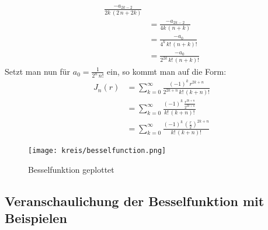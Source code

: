 \begin{refsection}
\begin{align*}
	\frac
	{
		-a_{2k - 2}
	}{
		2k \, \left( 2 \, n + 2k \right)	
	} \\
	&=
	\frac
	{
		-a_{2k - 2}
	}{
		4k \, \left( n + k \right)	
	} \\
	&=
	\frac
	{
		-a_0
	}{
		4^k \, {k}! \, {\left( n + k \right)}!
	} \\
	&=
	\frac
	{
		-a_0
	}{
		2^{2k} \, {k}! \, {\left( n + k \right)}!
	}
\end{align*}
Setzt man nun f\"ur $a_0 = \frac{1}{2^n \, {n}!}$ ein, so kommt man auf die Form:
\begin{align}
	J_n \left( r \right)
	&= \nonumber
	\sum_{k=0} ^{\infty}
	\frac
	{
		\left( - 1 \right) ^k \, r ^{2k+n}
	}{
		2^{2k+n} \, {k}! \, { \left( k + n \right) }!
	} \\
	&=
	\sum_{k=0} ^{\infty}
	\frac
	{
		\left( - 1 \right) ^k \, 
		\frac
		{
			r ^{2k+n}
		}{
			2^{2k+n}
		}
	}{
		{k}! \, { \left( k + n \right) }!
	} \\
	&=
	\sum_{k=0} ^{\infty}
	\frac
	{
		\left( - 1 \right) ^k \, 
		\left(		
		\frac
		{
			r
		}{
			2
		} \right) ^{2k+n}
	}{
		{k}! \, { \left( k + n \right) }!
	}
	\label{eq:bessel_summenformel}
\end{align}

\begin{figure}
	\texttt{[image: kreis/besselfunction.png]}
	\label{img:besselfunction}
	\caption[Besselfunktion]{Besselfunktion geplottet}
\end{figure}

\subsection{Veranschaulichung der Besselfunktion mit Beispielen}

\printbibliography[heading=subbibliography]
\end{refsection}

